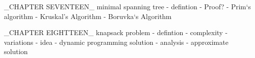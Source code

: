 \documentclass[openright,twoside,headsepline,bibtotoc]{scrbook}[2007/12/24]
\begin{document}
      	_CHAPTER SEVENTEEN_ minimal spanning tree
      	- defintion
      	- Proof?
      	- Prim‘s algorithm
      	- Kruskal’s Algorithm
      	- Boruvka‘s Algorithm
      	
      	_CHAPTER EIGHTTEEN_ knapsack problem
      	- defintion
      	- complexity
      	- variations
      	- idea
      	- dynamic programming solution
      	- analysis
      	- approximate solution
      		
      	
      	

        \appendix
        
        
        
        
        
\end{document}
